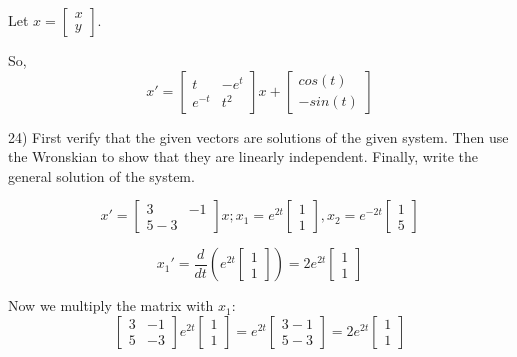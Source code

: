 \documentclass{article}
\begin{document}
Let $x = \begin{bmatrix}
    x \\
    y
\end{bmatrix}$.

So,
\[x' = \begin{bmatrix}
    t & -e^t \\
    e^{-t} & t^2
\end{bmatrix} x + \begin{bmatrix}
    cos(t) \\
    -sin(t)
\end{bmatrix}\]

24) First verify that the given vectors are solutions of the given system.
Then use the Wronskian to show that they are linearly independent.
Finally, write the general solution of the system.

\[x' = \begin{bmatrix}
    3 & -1 \\
    5 -3
\end{bmatrix} x; x_1 = e^{2t} \begin{bmatrix}
    1 \\
    1
\end{bmatrix}, x_2 = e^{-2t} \begin{bmatrix}
    1 \\
    5
\end{bmatrix}\]

\[x_1' = \frac{d}{dt} \left( e^{2t} \begin{bmatrix}
    1 \\
    1
\end{bmatrix} \right) = 2 e^{2t} \begin{bmatrix}
    1 \\
    1
\end{bmatrix}\]

Now we multiply the matrix with $x_1$:
\[\begin{bmatrix}
    3 & -1 \\
    5 & -3
\end{bmatrix} e^{2t} \begin{bmatrix}
    1 \\
    1
\end{bmatrix} = e^{2t} \begin{bmatrix}
    3 - 1 \\
    5 - 3
\end{bmatrix} = 2 e^{2t} \begin{bmatrix}
    1 \\
    1
\end{bmatrix}\]
\end{document}
